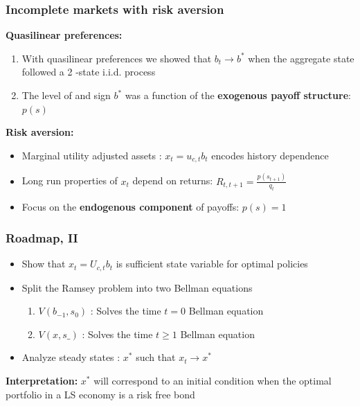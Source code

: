 \documentclass{beamer}
\begin{document}
\begin{frame}
 \frametitle{Incomplete markets with risk aversion}
 \textbf{Quasilinear preferences: } 
 \begin{enumerate}
  \item With quasilinear preferences we showed that $b_t\to b^*$ when the aggregate state followed a 2 -state i.i.d. process
  \item The level of and sign $b^*$ was a function of the \textbf{exogenous payoff structure}: $p(s)$
 \end{enumerate}
 
 \textbf{Risk aversion:}
  \begin{itemize}
   \item Marginal utility adjusted assets : $x_t=u_{c,t}b_{t}$ encodes history dependence
   \item Long run properties of $x_t$ depend on returns: $R_{t,t+1}=\frac{p(s_{t+1})}{q_t}$
   \item Focus on the \textbf{endogenous component} of payoffs:  $p(s)=1$
  \end{itemize}
  \end{frame}
%   
\begin{frame}
\frametitle{Roadmap, II}
\begin{itemize}

\item Show that $x_t=U_{c,t}b_{t}$ is sufficient state variable for optimal policies

\item Split the Ramsey problem into two Bellman equations
\begin{enumerate}
 \item $V(b_{-1},s_0)$ : Solves the time $t=0$ Bellman equation
 \item $V(x,s\_)$ : Solves the time $t\geq 1$ Bellman equation
\end{enumerate}

\item Analyze steady states : $x^*$ such that $x_t \to x^*$    

\end{itemize}
\textbf{Interpretation:}  $x^*$ will correspond to an initial condition when the optimal portfolio in a LS economy is a risk free bond

\end{frame}
\end{document}
